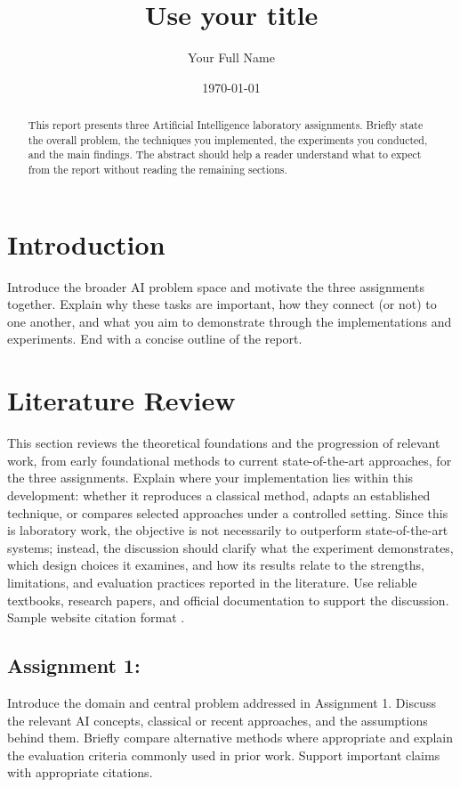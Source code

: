 \documentclass{ai-lab-report}
\title{Use your title}
\author{Your Full Name}
\date{\today}
\begin{document}
\maketitle

\begin{abstract}
This report presents three Artificial Intelligence laboratory assignments. Briefly state the overall problem, the techniques you implemented, the experiments you conducted, and the main findings. The abstract should help a reader understand what to expect from the report without reading the remaining sections.
\end{abstract}

\vspace{5mm}
\hline
\section{Introduction}
Introduce the broader AI problem space and motivate the three assignments together. Explain why these tasks are important, how they connect (or not) to one another, and what you aim to demonstrate through the implementations and experiments. End with a concise outline of the report.

\section{Literature Review}
This section reviews the theoretical foundations and the progression of relevant work, from early foundational methods to current state-of-the-art approaches, for the three assignments. Explain where your implementation lies within this development: whether it reproduces a classical method, adapts an established technique, or compares selected approaches under a controlled setting. Since this is laboratory work, the objective is not necessarily to outperform state-of-the-art systems; instead, the discussion should clarify what the experiment demonstrates, which design choices it examines, and how its results relate to the strengths, limitations, and evaluation practices reported in the literature. Use reliable textbooks, research papers, and official documentation to support the discussion.
Sample website citation format \citep{sklearnUserGuide}.

\subsection{Assignment 1: }
Introduce the domain and central problem addressed in Assignment 1. Discuss the relevant AI concepts, classical or recent approaches, and the assumptions behind them. Briefly compare alternative methods where appropriate and explain the evaluation criteria commonly used in prior work. Support important claims with appropriate citations.
\end{document}
